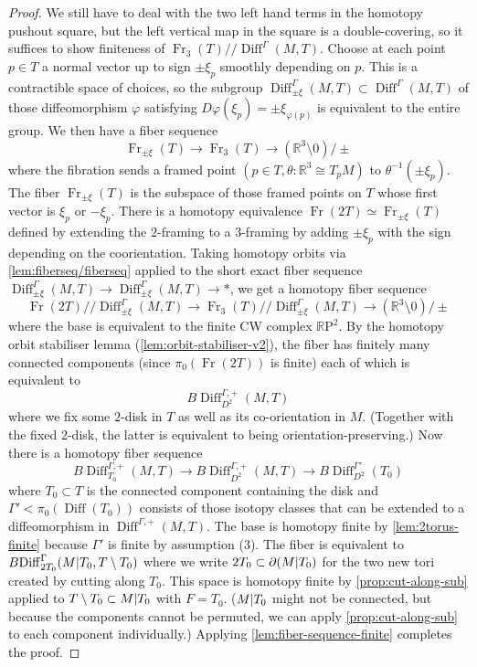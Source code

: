 \documentclass{amsart}
\theoremstyle{plain}
\theoremstyle{definition}
\DeclareMathOperator\Diff{Diff}
\DeclareMathOperator\Fr{Fr}
\newcommand{\ca}{\smash{\mid}} %
\newcommand{\hq}{/\!\!/} %
\newcommand{\BDiff}{B\!\Diff}
\newcommand{\bbR}{\mathbb{R}}
\newcommand{\RP}{\mathbb{R}\mathrm{P}}
\begin{document}
\begin{proof}
    We still have to deal with the two left hand terms in the homotopy pushout square, 
    but the left vertical map in the square is a double-covering, so it suffices to show finiteness of $\Fr_3(T) \hq \Diff^\Gamma(M,T)$.
    Choose at each point $p \in T$ a normal vector up to sign $\pm \xi_p$ smoothly depending on $p$.
    This is a contractible space of choices, so the subgroup $\Diff_{\pm \xi}^\Gamma(M, T) \subset \Diff^\Gamma(M, T)$ of those diffeomorphism $\varphi$ satisfying $D\varphi(\xi_p) = \pm \xi_{\varphi(p)}$ is equivalent to the entire group.
    We then have a fiber sequence
    \[
        \Fr_{\pm\xi}(T) \longrightarrow \Fr_3(T) \longrightarrow (\bbR^3\setminus 0)/\pm
    \]
    where the fibration sends a framed point $(p \in T, \theta\colon \bbR^3 \cong T_pM)$ to $\theta^{-1}(\pm \xi_p)$.
    The fiber $\Fr_{\pm\xi}(T)$ is the subspace of those framed points on $T$ whose first vector is $\xi_p$ or $-\xi_p$.
    There is a homotopy equivalence $\Fr(2T) \simeq \Fr_{\pm\xi}(T)$ defined by extending the $2$-framing to a $3$-framing by adding $\pm \xi_p$ with the sign depending on the coorientation.
    Taking homotopy orbits via \cref{lem:fiberseq/fiberseq} applied to the short exact fiber sequence $\Diff_{\pm\xi}^\Gamma(M, T)\to \Diff_{\pm\xi}^\Gamma(M, T)\to *$, we get a homotopy fiber sequence
    \[
        \Fr(2T)\hq \Diff_{\pm\xi}^\Gamma(M, T) \longrightarrow
        \Fr_3(T)\hq \Diff_{\pm\xi}^\Gamma(M, T) \longrightarrow (\bbR^3\setminus 0)/\pm
    \]
    where the base is equivalent to the finite CW complex $\RP^2$.
    By the homotopy orbit stabiliser lemma (\cref{lem:orbit-stabiliser-v2}), the fiber has finitely many connected components (since $\pi_0(\Fr(2T))$ is finite) each of which is equivalent to
    \[
        \BDiff_{D^2}^{\Gamma, +}(M, T)
    \]
    where we fix some $2$-disk in $T$ as well as its co-orientation in $M$. (Together with the fixed 2-disk, the latter is equivalent to being orientation-preserving.) 
    Now there is a homotopy fiber sequence
    \[
        \BDiff_{T_0}^{\Gamma,+}(M, T) \longrightarrow 
        \BDiff_{D^2}^{\Gamma, +}(M, T)
        \longrightarrow \BDiff_{D^2}^{\Gamma'}(T_0)
    \]
    where $T_0 \subset T$ is the connected component containing the disk and $\Gamma' < \pi_0(\Diff(T_0))$ consists of those isotopy classes that can be extended to a diffeomorphism in $\Diff^{\Gamma,+}(M, T)$.
    The base is homotopy finite by \cref{lem:2torus-finite} because $\Gamma'$ is finite by assumption (3).
    The fiber is equivalent to $\BDiff_{2T_0}^{\Gamma}(M\ca T_0, T \setminus T_0)$
    where we write $2T_0 \subset \partial(M \ca T_0)$ for the two new tori created by cutting along $T_0$.
    This space is homotopy finite by \cref{prop:cut-along-sub} applied to $T \setminus T_0 \subset M \ca T_0$ with $F = T_0$. 
    ($M \ca T_0$ might not be connected, but because the components cannot be permuted, we can apply \cref{prop:cut-along-sub} to each component individually.)
    Applying \cref{lem:fiber-sequence-finite} completes the proof.
\end{proof}
\end{document}
